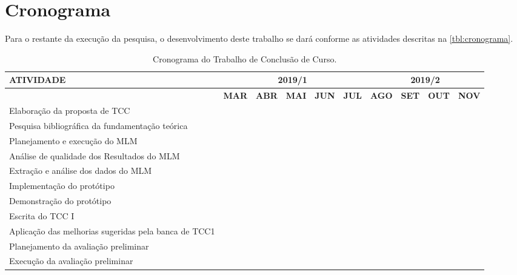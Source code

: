 \section{Cronograma}

Para o restante da execução da pesquisa, o desenvolvimento deste trabalho se dará conforme as atividades descritas na \autoref{tbl:cronograma}.


\begin{landscape}
\begin{table}[!htb]
    \caption{Cronograma do Trabalho de Conclusão de Curso.}
    \label{tbl:cronograma}
	\centering
		\begin{tabular}{l|c|c|c|c|c|c|c|c|c}
		\bottomrule
		\rowcolor[HTML]{C0C0C0}
		\textbf{ATIVIDADE}&\multicolumn{5}{c|}{\large\textbf{2019/1}}&\multicolumn{4}{c}{\large\textbf{2019/2}}\\
		\hline
		\rowcolor[HTML]{C0C0C0}
		&\textbf{MAR}&\textbf{ABR}&\textbf{MAI}&\textbf{JUN}&\textbf{JUL}&\textbf{AGO}&\textbf{SET}&\textbf{OUT}&\textbf{NOV}\\
		\hline
		Elaboração da proposta de TCC &\cellcolor{Blue}&&&&&&&&\\
		\hline
		Pesquisa bibliográfica da fundamentação teórica &\cellcolor{Blue}&\cellcolor{Blue}&\cellcolor{Blue}&&&&&&\\
		\hline
		Planejamento e execução do MLM &\cellcolor{Blue}&\cellcolor{Blue}&\cellcolor{Blue}&&&&&&\\
		\hline	
		Análise de qualidade dos Resultados do MLM &&\cellcolor{Blue}&\cellcolor{Blue}&&&&&&\\
		\hline			
		Extração e análise dos dados do MLM &&\cellcolor{Blue}&\cellcolor{Blue}&&&&&&\\
		\hline	
		Implementação do protótipo &&&\cellcolor{Blue}&\cellcolor{Blue}&&&&&\\
		\hline
		Demonstração do protótipo &&&&\cellcolor{Blue}&&&&&\\
		\hline
		Escrita do TCC I &&\cellcolor{Blue}&\cellcolor{Blue}&\cellcolor{Blue}&&&&&\\
		\hline
		Aplicação das melhorias sugeridas pela banca de TCC1&&&&\cellcolor{midgray}&\cellcolor{midgray}&&&&\\
		\hline
		Planejamento da avaliação preliminar &&&&\cellcolor{midgray}&\cellcolor{midgray}&&&&\\
		\hline
		Execução da avaliação preliminar &&&&&\cellcolor{midgray}&&&&\\

\end{tabular}
\end{table}
\end{landscape}
